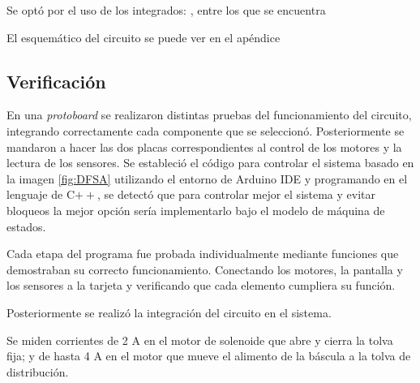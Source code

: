 Se optó por el uso de los integrados: , entre los que se encuentra  

El esquemático del circuito se puede ver en el apéndice 

\subsection{Verificación}

En una \textit{protoboard} se realizaron distintas pruebas del funcionamiento del circuito, integrando correctamente cada componente que se seleccionó. Posteriormente se mandaron a hacer las dos placas correspondientes al control de los motores y la lectura de los sensores. Se estableció el código para controlar el sistema basado en la imagen \ref{fig:DFSA} utilizando el entorno de Arduino IDE y programando en el lenguaje de C$++$, se detectó que para controlar mejor el sistema y evitar bloqueos la mejor opción sería implementarlo bajo el modelo de máquina de estados. 

Cada etapa del programa fue probada individualmente mediante funciones que demostraban su correcto funcionamiento. Conectando los motores, la pantalla y los sensores a la tarjeta y verificando que cada elemento cumpliera su función. 

Posteriormente se realizó la integración del circuito en el sistema. 

Se miden corrientes de 2 A en el motor de solenoide que abre y cierra la tolva fija; y de hasta 4 A en el motor que mueve el alimento de la báscula a la tolva de distribución.










\endinput 